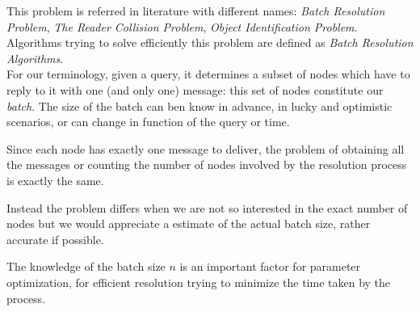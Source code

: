 \documentclass[12pt,a4paper]{report}
\begin{document}
This problem is referred in literature with different names: \emph{Batch Resolution Problem}, \emph{The Reader Collision Problem}, \emph{Object Identification Problem}.\\
Algorithms trying to solve efficiently this problem are defined as \emph{Batch Resolution Algorithms}.\\ 

For our terminology, given a query, it determines a subset of nodes which have to reply to it with one (and only one) message: this set of nodes constitute our \emph{batch}. The size of the batch can ben know in advance, in lucky and optimistic scenarios, or can change in function of the query or time.

Since each node has exactly one message to deliver, the problem of obtaining all the messages or counting the number of nodes involved by the resolution process is exactly the same.

Instead the problem differs when we are not so interested in the exact number of nodes but we would appreciate a estimate of the actual batch size, rather accurate if possible.

The knowledge of the batch size $n$ is an important factor for parameter optimization, for efficient resolution trying to minimize the time taken by the process.

\begin{comment}
This necessitates the usage of algorithms for resolving batch collisions (conflicts) with unknown conflict multiplicity $n$.

In this paper we present a novel approach to the problem of collision resolution for batch conflicts. We show how the conventional tree algorithms for collision resolution can be used to obtain progressively accurate estimation of the multiplicity. We use the estimation to propose a more efficient binary tree algorithm, termed Estimating Binary Tree (EBT) algorithm. The EBT algorithm is suited for implementation when the conflicting nodes are passive, such as e.g. RFID tags. We extend the approach to design the Interval Estimation Conflict Resolution (IECR) algorithm. For $n \rightarrow \infty $  we prove that the efficiency achieved by IECR for batch arrivals is identical with the efficiency that Gallager’s FCFS algorithm achieves for Poisson packet arrivals. For finite n, the simulation results show that IECR is, to the best of our knowledge, the most efficient batch resolution algorithm reported to date.
\end{comment}
\end{document}
